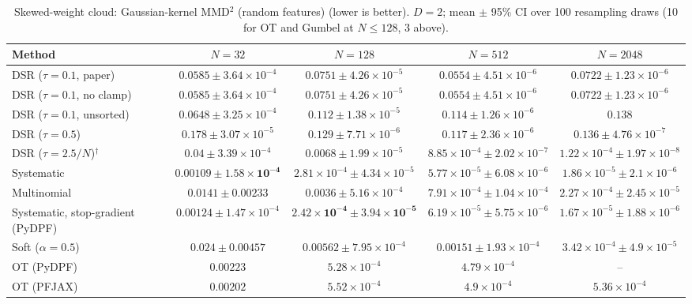 \begin{table}[H]
\centering
\small
\caption{Skewed-weight cloud: Gaussian-kernel MMD$^2$ (random features) (lower is better). $D{=}2$; mean $\pm$ 95\% CI over 100 resampling draws (10 for OT and Gumbel at $N\le128$, 3 above).}
\label{tab:static-skewed-rff_mmd2}
\begin{adjustbox}{max width=\linewidth}
\begin{tabular}{lcccc}
\toprule
Method & $N{=}32$ & $N{=}128$ & $N{=}512$ & $N{=}2048$ \\
\midrule
DSR ($\tau{=}0.1$, paper) & $0.0585\pm3.64\times10^{-4}$ & $0.0751\pm4.26\times10^{-5}$ & $0.0554\pm4.51\times10^{-6}$ & $0.0722\pm1.23\times10^{-6}$ \\
DSR ($\tau{=}0.1$, no clamp) & $0.0585\pm3.64\times10^{-4}$ & $0.0751\pm4.26\times10^{-5}$ & $0.0554\pm4.51\times10^{-6}$ & $0.0722\pm1.23\times10^{-6}$ \\
DSR ($\tau{=}0.1$, unsorted) & $0.0648\pm3.25\times10^{-4}$ & $0.112\pm1.38\times10^{-5}$ & $0.114\pm1.26\times10^{-6}$ & $0.138$ \\
DSR ($\tau{=}0.5$) & $0.178\pm3.07\times10^{-5}$ & $0.129\pm7.71\times10^{-6}$ & $0.117\pm2.36\times10^{-6}$ & $0.136\pm4.76\times10^{-7}$ \\
DSR ($\tau{=}2.5/N$)$^\dagger$ & $0.04\pm3.39\times10^{-4}$ & $0.0068\pm1.99\times10^{-5}$ & $8.85\times10^{-4}\pm2.02\times10^{-7}$ & $1.22\times10^{-4}\pm1.97\times10^{-8}$ \\
\midrule
Systematic & $\mathbf{0.00109\pm1.58\times10^{-4}}$ & $2.81\times10^{-4}\pm4.34\times10^{-5}$ & $5.77\times10^{-5}\pm6.08\times10^{-6}$ & $1.86\times10^{-5}\pm2.1\times10^{-6}$ \\
Multinomial & $0.0141\pm0.00233$ & $0.0036\pm5.16\times10^{-4}$ & $7.91\times10^{-4}\pm1.04\times10^{-4}$ & $2.27\times10^{-4}\pm2.45\times10^{-5}$ \\
Systematic, stop-gradient (PyDPF) & $0.00124\pm1.47\times10^{-4}$ & $\mathbf{2.42\times10^{-4}\pm3.94\times10^{-5}}$ & $6.19\times10^{-5}\pm5.75\times10^{-6}$ & $1.67\times10^{-5}\pm1.88\times10^{-6}$ \\
Soft ($\alpha{=}0.5$) & $0.024\pm0.00457$ & $0.00562\pm7.95\times10^{-4}$ & $0.00151\pm1.93\times10^{-4}$ & $3.42\times10^{-4}\pm4.9\times10^{-5}$ \\
OT (PyDPF) & $0.00223$ & $5.28\times10^{-4}$ & $4.79\times10^{-4}$ & -- \\
OT (PFJAX) & $0.00202$ & $5.52\times10^{-4}$ & $4.9\times10^{-4}$ & $5.36\times10^{-4}$ \\

\end{tabular}
\end{adjustbox}
\end{table}
